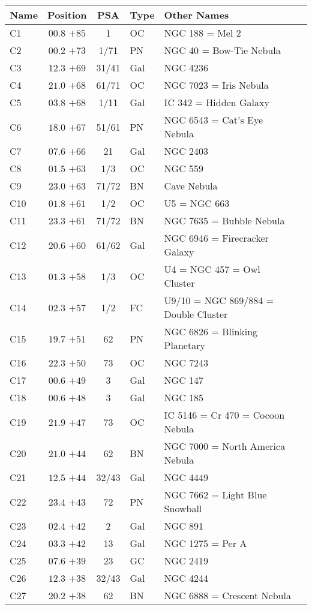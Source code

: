 \begin{table}[p]
\setlength{\tabcolsep}{3pt}
\small
\begin{tabular}{lcclll}
\hline
Name&Position&PSA&Type&Other Names\\
\hline
C1   &$00.8$ $+85$&1&OC &NGC 188 = Mel 2\\
C2   &$00.2$ $+73$&1/71&PN &NGC 40 = Bow-Tie Nebula\\
C3   &$12.3$ $+69$&31/41&Gal&NGC 4236\\
C4   &$21.0$ $+68$&61/71&OC &NGC 7023 = Iris Nebula\\
C5   &$03.8$ $+68$&1/11&Gal&IC 342 = Hidden Galaxy\\
C6   &$18.0$ $+67$&51/61&PN &NGC 6543 = Cat's Eye Nebula\\
C7   &$07.6$ $+66$&21&Gal&NGC 2403\\
C8   &$01.5$ $+63$&1/3&OC &NGC 559\\
C9   &$23.0$ $+63$&71/72&BN &Cave Nebula\\
C10  &$01.8$ $+61$&1/2&OC &U5 = NGC 663\\
C11  &$23.3$ $+61$&71/72&BN &NGC 7635 = Bubble Nebula\\
C12  &$20.6$ $+60$&61/62&Gal&NGC 6946 = Firecracker Galaxy\\
C13  &$01.3$ $+58$&1/3&OC &U4 = NGC 457 = Owl Cluster\\
C14  &$02.3$ $+57$&1/2&FC &U9/10 = NGC 869/884 = Double Cluster\\
C15  &$19.7$ $+51$&62&PN &NGC 6826 = Blinking Planetary\\
C16  &$22.3$ $+50$&73&OC &NGC 7243\\
C17  &$00.6$ $+49$&3&Gal&NGC 147\\
C18  &$00.6$ $+48$&3&Gal&NGC 185\\
C19  &$21.9$ $+47$&73&OC &IC 5146 = Cr 470 = Cocoon Nebula\\
C20  &$21.0$ $+44$&62&BN &NGC 7000 = North America Nebula\\
C21  &$12.5$ $+44$&32/43&Gal&NGC 4449\\
C22  &$23.4$ $+43$&72&PN &NGC 7662 = Light Blue Snowball\\
C23  &$02.4$ $+42$&2&Gal&NGC 891\\
C24  &$03.3$ $+42$&13&Gal&NGC 1275 = Per A\\
C25  &$07.6$ $+39$&23&GC &NGC 2419\\
C26  &$12.3$ $+38$&32/43&Gal&NGC 4244\\
C27  &$20.2$ $+38$&62&BN &NGC 6888 = Crescent Nebula\\

\end{tabular}
\end{table}
